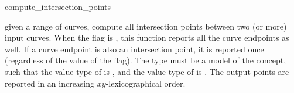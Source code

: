 \ccRefPageBegin

\begin{ccRefFunction}{compute_intersection_points}


{given a range of curves, compute all intersection points between two (or more)
 input curves. When the flag  is , 
  this function reports all the curve endpoints as well. If a curve
  endpoint is also an intersection point, it is reported once (regardless
  of the value of the  flag). The  type
  must be a model of the  concept, such that the
  value-type of  is , and the
  value-type of  is .
 The output points are reported in an increasing $xy$-lexicographical order.}

\end{ccRefFunction}

\ccRefPageEnd

